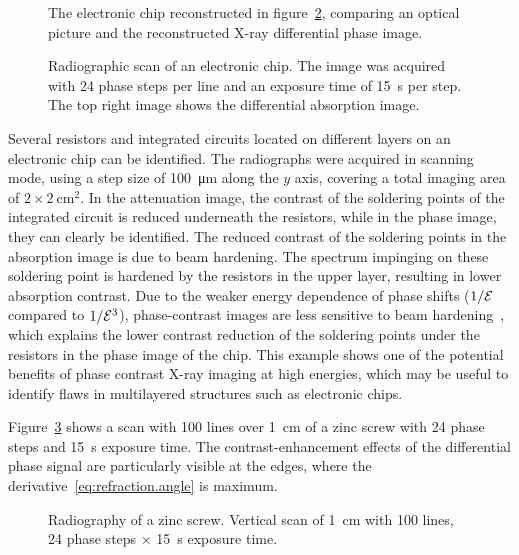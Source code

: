 \begin{figure}[htb]
\begin{subfigure}[b]{.49\textwidth}
    \caption{}
    \end{subfigure}
    \caption[Photo of an electronic chip.]{The electronic chip reconstructed in figure~\ref{fig:img_chip},
comparing an optical picture and the reconstructed X-ray differential phase
image.}
    \label{fig:chip_photo}
\end{figure}

\begin{figure}[htp]
    \centering
    
    \caption{Radiographic scan of an electronic chip. The image was acquired
        with 24 phase steps per line and an exposure time of \SI{15}{\second} per
    step. The top right image shows the differential absorption image.}\label{fig:img_chip}
\end{figure}

Several resistors and integrated circuits located on different
layers on an electronic chip can be identified. The radiographs were acquired in scanning
mode, using a step size of \SI{100}{\micro\metre} along the $y$ axis, covering a total imaging
area of $2 \times \SI{2}{\centi\metre^2}$. In the attenuation image, the contrast of the soldering
points of the integrated circuit is reduced underneath the resistors, while
in the phase image, they can clearly be identified. The reduced contrast of
the soldering points in the absorption image is due to beam hardening. The
spectrum impinging on these soldering point is hardened by the resistors in
the upper layer, resulting in lower absorption contrast. Due to the weaker
energy dependence of phase shifts ($1/\mathcal{E}$ compared to $1/\mathcal{E}^3$), phase-contrast
images are less sensitive to beam hardening~\parencite{Chabior2011a}, which explains the lower
contrast reduction of the soldering points under the resistors in the
phase image of the chip. This example shows one of the potential benefits of
phase contrast X-ray imaging at high energies, which may be useful to
identify flaws in multilayered structures such as electronic chips.

Figure~\ref{fig:screw} shows a scan with \num{100} lines over
\SI{1}{\centi\metre} of a zinc screw
with \num{24} phase steps and \SI{15}{\second} exposure time.
The contrast-enhancement effects of the differential phase signal are
particularly visible at the edges, where the
derivative~\eqref{eq:refraction.angle} is maximum.

\begin{figure}[hbt]
    \centering
    
    \caption[Radiography of a zinc screw.]{Radiography of a zinc screw.
        Vertical scan of \SI{1}{\centi\metre} with \num{100} lines,
        \num{24} phase steps $\times$ \SI{15}{\second} exposure time.}
    \label{fig:screw}
\end{figure}

